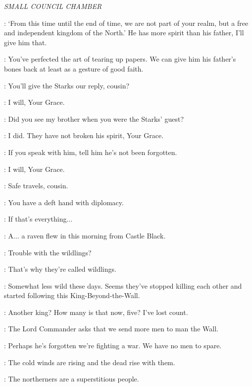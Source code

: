 \scene

\textit{SMALL COUNCIL CHAMBER}


\CERSEI: `From this time until the end of time, we are not part of
your realm, but a free and independent kingdom of the North.' He has
more spirit than his father, I'll give him that. 

\TYRION: You've perfected the art of tearing up papers. We can give him his father's bones back at least as a gesture of good faith.

\CERSEI: You'll give the Starks our reply, cousin?

\ALTON: I will, Your Grace.

\CERSEI: Did you see my brother when you were the Starks' guest?

\ALTON: I did. They have not broken his spirit, Your Grace.

\CERSEI: If you speak with him, tell him he's not been forgotten.

\ALTON: I will, Your Grace.

\TYRION: Safe travels, cousin.


\TYRION: You have a deft hand with diplomacy.

\CERSEI: If that's everything$\ldots$

\PYCELLE: A$\ldots$ a raven flew in this morning from Castle Black.


\VARYS: Trouble with the wildlings?

\LITTLEFINGER: That's why they're called wildlings.

\VARYS: Somewhat less wild these days. Seems they've stopped killing each other and started following this King-Beyond-the-Wall.

\CERSEI: Another king? How many is that now, five? I've lost count.

\TYRION: The Lord Commander asks that we send more men to man the Wall.

\CERSEI: Perhaps he's forgotten we're fighting a war. We have no men to spare.

\TYRION: The cold winds are rising and the dead rise with them.

\PYCELLE: The northerners are a superstitious people.

